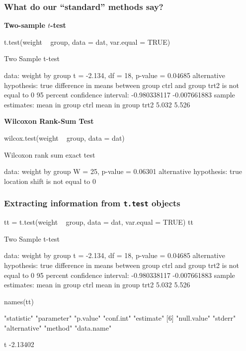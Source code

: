 \documentclass[a4paper]{article}
\begin{document}
\subsubsection{What do our ``standard'' methods say?}
\textbf{Two-sample \( t \)-test}
\begin{Schunk}
\begin{Sinput}
t.test(weight ~ group, data = dat, var.equal = TRUE)
\end{Sinput}
\begin{Soutput}

	Two Sample t-test

data:  weight by group
t = -2.134, df = 18, p-value = 0.04685
alternative hypothesis: true difference in means between group ctrl and group trt2 is not equal to 0
95 percent confidence interval:
 -0.980338117 -0.007661883
sample estimates:
mean in group ctrl mean in group trt2 
             5.032              5.526 
\end{Soutput}
\end{Schunk}
\textbf{Wilcoxon Rank-Sum Test}
\begin{Schunk}
\begin{Sinput}
wilcox.test(weight ~ group, data = dat)
\end{Sinput}
\begin{Soutput}

	Wilcoxon rank sum exact test

data:  weight by group
W = 25, p-value = 0.06301
alternative hypothesis: true location shift is not equal to 0
\end{Soutput}
\end{Schunk}
\subsubsection{Extracting information from \lstinline|t.test| objects}
\begin{Schunk}
\begin{Sinput}
tt = t.test(weight ~ group, data = dat, var.equal = TRUE)
tt
\end{Sinput}
\begin{Soutput}

	Two Sample t-test

data:  weight by group
t = -2.134, df = 18, p-value = 0.04685
alternative hypothesis: true difference in means between group ctrl and group trt2 is not equal to 0
95 percent confidence interval:
 -0.980338117 -0.007661883
sample estimates:
mean in group ctrl mean in group trt2 
             5.032              5.526 
\end{Soutput}
\begin{Sinput}
names(tt)
\end{Sinput}
\begin{Soutput}
 [1] "statistic"   "parameter"   "p.value"     "conf.int"    "estimate"   
 [6] "null.value"  "stderr"      "alternative" "method"      "data.name"  
\end{Soutput}
\begin{Soutput}
       t 
-2.13402 
\end{Soutput}
\end{Schunk}
\end{document}

